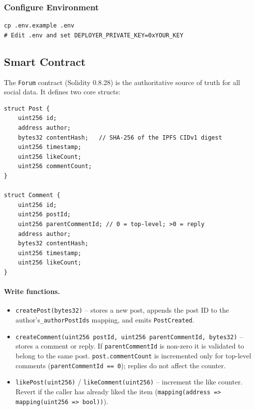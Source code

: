 \documentclass[11pt]{article}
\begin{document}
\subsubsection{Configure Environment}

\begin{lstlisting}[style=command]
cp .env.example .env
# Edit .env and set DEPLOYER_PRIVATE_KEY=0xYOUR_KEY
\end{lstlisting}

\subsection{Smart Contract}

The \texttt{Forum} contract (Solidity 0.8.28) is the authoritative source of truth for all social data. It defines two core structs:

\begin{lstlisting}[style=command]
struct Post {
    uint256 id;
    address author;
    bytes32 contentHash;   // SHA-256 of the IPFS CIDv1 digest
    uint256 timestamp;
    uint256 likeCount;
    uint256 commentCount;
}

struct Comment {
    uint256 id;
    uint256 postId;
    uint256 parentCommentId; // 0 = top-level; >0 = reply
    address author;
    bytes32 contentHash;
    uint256 timestamp;
    uint256 likeCount;
}
\end{lstlisting}

\paragraph{Write functions.}
\begin{itemize}
  \item \texttt{createPost(bytes32)} -- stores a new post, appends the post ID to the author's\linebreak \texttt{\_authorPostIds} mapping, and emits \texttt{PostCreated}.
  \item \texttt{createComment(uint256 postId, uint256 parentCommentId, bytes32)} -- stores a comment or reply. If \texttt{parentCommentId} is non-zero it is validated to belong to the same post. \texttt{post.commentCount} is incremented only for top-level comments (\texttt{parentCommentId == 0}); replies do not affect the counter.
  \item \texttt{likePost(uint256)} / \texttt{likeComment(uint256)} – increment the like counter. Revert if the caller has already liked the item (\texttt{mapping(address => mapping(uint256 => bool))}).
\end{itemize}
\end{document}
